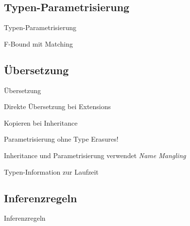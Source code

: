 \subsection{Typen-Parametrisierung}
\begin{frame}{Typen-Parametrisierung}
	\begin{bigitemize}{3mm}
		\item F-Bound mit Matching
	\end{bigitemize}
\end{frame}

\subsection{Übersetzung}
\begin{frame}{Übersetzung}
	\begin{bigitemize}{3mm}
		\item Direkte Übersetzung bei Extensions
		\item Kopieren bei Inheritance
		\item Parametrisierung ohne Type Erasures!
		\item Inheritance und Parametrisierung verwendet \emph{Name Mangling}
		\item Typen-Information zur Laufzeit
	\end{bigitemize}
\end{frame}

\subsection{Inferenzregeln}
\begin{frame}{Inferenzregeln}
\end{frame}
